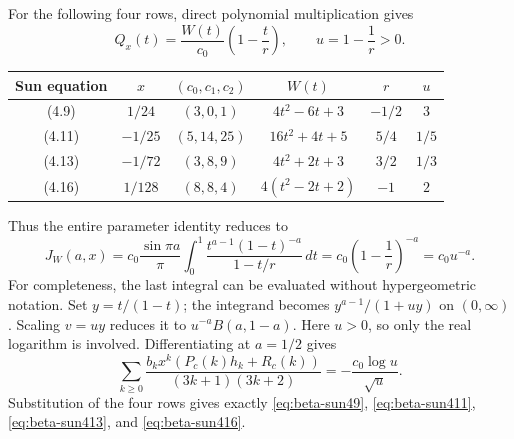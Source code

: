 \documentclass[11pt,a4paper]{article}
\theoremstyle{remark}\newtheorem{remark}[theorem]{Remark}
\numberwithin{equation}{section}
\begin{document}
For the following four rows, direct polynomial multiplication gives
\begin{equation}
 Q_x(t)=\frac{W(t)}{c_0}\left(1-\frac t r\right),
 \qquad u=1-\frac1r>0.
 \label{eq:beta-cancel}
\end{equation}
\begin{center}
\begin{tabular}{c|c|c|c|c|c}
Sun equation &$x$&$(c_0,c_1,c_2)$&$W(t)$&$r$&$u$\\\hline
(4.9)&$1/24$&$(3,0,1)$&$4t^2-6t+3$&$-1/2$&$3$\\
(4.11)&$-1/25$&$(5,14,25)$&$16t^2+4t+5$&$5/4$&$1/5$\\
(4.13)&$-1/72$&$(3,8,9)$&$4t^2+2t+3$&$3/2$&$1/3$\\
(4.16)&$1/128$&$(8,8,4)$&$4(t^2-2t+2)$&$-1$&$2$
\end{tabular}
\end{center}
Thus the entire parameter identity reduces to
\begin{equation}
 J_W(a,x)=c_0\frac{\sin\pi a}{\pi}
 \int_0^1\frac{t^{a-1}(1-t)^{-a}}{1-t/r}\,dt
 =c_0\left(1-\frac1r\right)^{-a}=c_0u^{-a}.
 \label{eq:beta-parameter-collapse}
\end{equation}
For completeness, the last integral can be evaluated without
hypergeometric notation. Set $y=t/(1-t)$; the integrand becomes
$y^{a-1}/(1+uy)$ on $(0,\infty)$. Scaling $v=uy$ reduces it to
$u^{-a}B(a,1-a)$. Here $u>0$, so only the real logarithm is involved.
Differentiating at $a=1/2$ gives
\begin{equation}
 \sum_{k\ge0}\frac{b_kx^k(P_c(k)h_k+R_c(k))}
 {(3k+1)(3k+2)}=-\frac{c_0\log u}{\sqrt u}.
 \label{eq:beta-first-family-final}
\end{equation}
Substitution of the four rows gives exactly
\eqref{eq:beta-sun49}, \eqref{eq:beta-sun411},
\eqref{eq:beta-sun413}, and \eqref{eq:beta-sun416}.
\end{document}

